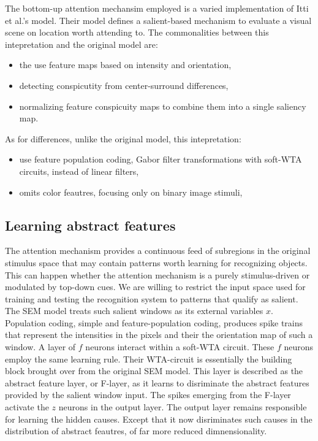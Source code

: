 \documentclass{report}
\begin{document}
The bottom-up attention mechansim employed is a varied implementation of Itti et al.'s model. Their model defines a salient-based mechanism to evaluate a visual scene on location worth attending to.
The commonalities between this intepretation and the original model are:
\begin{itemize}
  \item the use feature maps based on intensity and orientation,
  \item detecting conspicutity from center-surround differences,
  \item normalizing feature conspicuity maps to combine them into a single saliency map.
\end{itemize}
As for differences, unlike the original model, this intepretation:
\begin{itemize}
  \item use feature population coding, Gabor filter transformations with soft-WTA circuits, instead of linear filters,
  \item omits color feautres, focusing only on binary image stimuli,
\end{itemize}

\subsection{Learning abstract features}

The attention mechanism provides a continuous feed of subregions in the original stimulus space that may contain patterns worth learning for recognizing objects. This can happen whether the attention mechanism is a purely stimulus-driven or modulated by top-down cues. We are willing to restrict the input space used for training and testing the recognition system to patterns that qualify as salient. The SEM model treats such salient windows as its external variables $x$. Population coding, simple and feature-population coding, produces spike trains that represent the intensities in the pixels and their the orientation map of such a window. A layer of $f$ neurons interact within a soft-WTA circuit. These $f$ neurons employ the same learning rule. Their WTA-circuit is essentially the building block brought over from the original SEM model. This layer is described as the abstract feature layer, or F-layer, as it learns to disriminate the abstract features provided by the salient window input. The spikes emerging from the F-layer activate the $z$ neurons in the output layer. The output layer remains responsible for learning the hidden causes. Except that it now disriminates such causes in the distribution of abstract feautres, of far more reduced dimnensionality.
\end{document}
